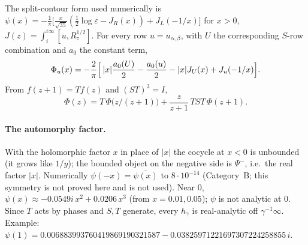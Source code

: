 The split-contour form used numerically is $\psi(x)=-\tfrac1\pi\bigl[\tfrac x{\sqrt{35}}(\tfrac12\log\varepsilon-J_R(x))+J_L(-1/x)\bigr]$ for $x>0$,
$J(z)=\int_i^{i\infty}[u,R_z^{1/2}]$. For every row $u=u_{\alpha,\beta}$, with $U$ the corresponding $S$-row combination and $a_0$ the constant term,
\begin{equation}\label{eq:rowform}
\Phi_u(x)=-\frac2\pi\Bigl[\,|x|\frac{a_0(U)}2-\frac{a_0(u)}2-|x|J_U(x)+J_u(-1/x)\Bigr].
\end{equation}
From $f(z+1)=Tf(z)$ and $(ST)^3=I$,
\begin{equation}\label{eq:3term}
\Phi(z)=T\,\Phi\bigl(z/(z+1)\bigr)+\frac z{z+1}\,TST\,\Phi(z+1).
\end{equation}

\paragraph{The automorphy factor.} With the holomorphic factor $x$ in place of $|x|$ the cocycle at $x<0$ is unbounded (it grows like $1/y$); the bounded
object on the negative side is $\Psi^-$, i.e.\ the real factor $|x|$. Numerically $\psi(-x)=\overline{\psi(x)}$ to $8\cdot10^{-14}$ (Category~B; this
symmetry is not proved here and is not used). Near $0$, $\psi(x)\approx-0.0549i\,x^2+0.0206\,x^3$ (from $x=0.01,0.05$); $\psi$ is not analytic at $0$.
Since $T$ acts by phases and $S,T$ generate, every $h_\gamma$ is real-analytic off $\gamma^{-1}\infty$. Example:
$\psi(1)=0.006883993760419869190321587-0.03825971221697307224258855\,i$.

